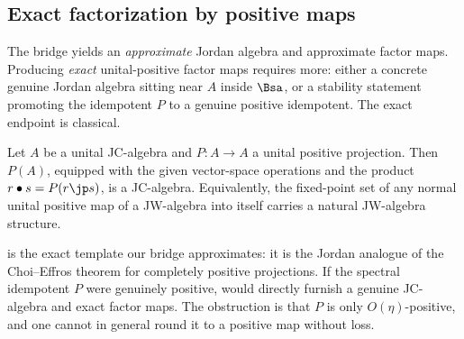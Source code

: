 \subsection{Exact factorization by positive maps}

The bridge yields an \emph{approximate} Jordan algebra and approximate factor
maps. Producing \emph{exact} unital-positive factor maps requires more: either a
concrete genuine Jordan algebra sitting near $A$ inside $\Bsa$, or a stability
statement promoting the idempotent $P$ to a genuine positive idempotent. The
exact endpoint is classical.

\begin{theorem}\label{thm:effros-stormer}
Let $A$ be a unital JC-algebra and $P\colon A\to A$ a unital positive
projection. Then $P(A)$, equipped with the given vector-space operations and the
product $r\bullet s=P(r\jp s)$, is a JC-algebra. Equivalently, the fixed-point
set of any normal unital positive map of a JW-algebra into itself carries a
natural JW-algebra structure.
\end{theorem}

 is the exact template our bridge approximates: it is
the Jordan analogue of the Choi--Effros theorem \cite{ChoiEffros1977} for
completely positive projections. If the spectral idempotent $P$ were genuinely
positive,
 would directly furnish a genuine JC-algebra and exact
factor maps. The obstruction is that $P$ is only $O(\eta)$-positive, and one
cannot in general round it to a positive map without loss.

